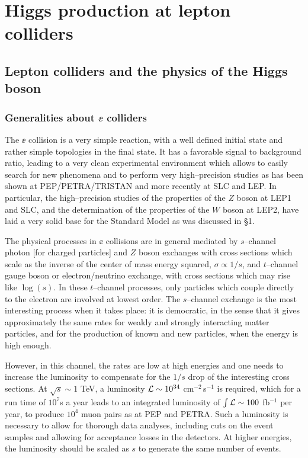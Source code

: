 
\section{Higgs production at lepton colliders}
\setcounter{equation}{0}
\renewcommand{\theequation}{4.\arabic{equation}}

\subsection{Lepton colliders and the physics of the Higgs boson}

\subsubsection{Generalities about $\ee$ colliders}

The $\ee$ collision \cite{ee-basics-review} is a very simple reaction, with a
well defined initial state and rather simple topologies in the final state. It
has a favorable signal to background ratio, leading to a very clean
experimental environment which allows to easily search for new phenomena and to
perform very high--precision studies as has been shown at PEP/PETRA/TRISTAN and
more recently at SLC and LEP.  In particular, the  high--precision studies of 
the properties of the $Z$ boson at LEP1 and SLC, and the determination of the
properties of the $W$ boson at LEP2,  have laid a very solid base for the
Standard Model as was discussed in \S1.\s

The physical processes in $\ee$ collisions are in general mediated by
$s$--channel photon [for charged particles] and $Z$ boson exchanges with cross
sections which scale as the inverse of the center of mass energy squared,
$\sigma \propto 1/s$, and $t$--channel gauge boson or electron/neutrino
exchange, with cross sections which may rise like $\log(s)$. In these
$t$--channel processes, only particles which couple directly to the electron
are involved at lowest order.  The $s$--channel exchange is the most
interesting process when it takes place: it is democratic, in the sense that it
gives approximately the same rates for weakly and strongly interacting matter
particles, and for the production of known and new particles, when the energy
is high enough.\s

However, in this channel, the rates are low at high energies and one needs to
increase the luminosity to compensate for the $1/s$ drop of the interesting
cross sections. At $\sqrt{s} \sim 1$ TeV, a luminosity ${\cal L}\sim 10^{34}$ 
cm$^{-2}\,$s$^{-1}$ is required, which for a run time of $10^7$s a year leads
to an integrated luminosity  of $\int {\cal L} \sim 100$ fb$^{-1}$ per year, to
produce $10^4$ muon pairs as at PEP and PETRA. Such a luminosity is necessary
to allow for thorough data analyses, including cuts on the event samples and
allowing for acceptance losses in the detectors. At higher energies, the
luminosity should be scaled as $s$ to generate the same number of events.\s

